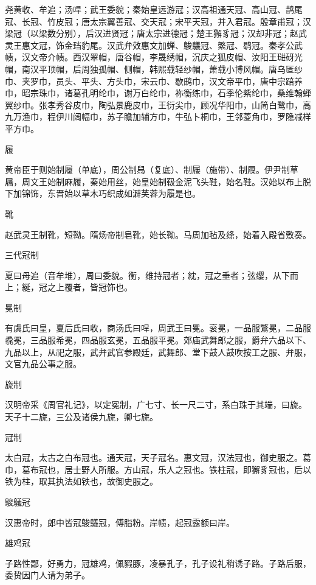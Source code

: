 \documentclass[a4paper,12pt,UTF8,twoside]{ctexbook}
\begin{document}
    尧黄收、牟追；汤哻；武王委貌；秦始皇远游冠；汉高祖通天冠、高山冠、鹊尾冠、长冠、竹皮冠；唐太宗翼善冠、交天冠；宋平天冠，并入君冠。殷章甫冠；汉梁冠（以梁数分别），后汉进贤冠；唐太宗进德冠；楚王獬豸冠；汉却非冠；赵武灵王惠文冠，饰金珰豹尾。汉武弁效惠文加蝉、鵔鸃冠、繁冠、鹖冠。秦孝公武帻，汉文帝介帻。西汉翠帽，唐谷帽，李晟绣帽，沉庆之狐皮帽、汝阳王琎砑光帽，南汉平顶帽，后周独孤帽、侧帽，韩熙载轻纱帽，萧载小博风帽。唐乌匼纱巾、夹罗巾，员头、平头、方头巾，宋云巾、歇鸱巾，汉文帝平巾，唐中宗踣养巾，昭宗珠巾，诸葛孔明纶巾，谢万白纶巾，祢衡练巾，石季伦紫纶巾，桑维翰蝉翼纱巾。张孝秀谷皮巾，陶弘景鹿皮巾，王衍尖巾，顾况华阳巾，山简白鹭巾，高九万渔巾，程伊川阔幅巾，苏子瞻加辅方巾，牛弘卜桐巾，王邻菱角巾，罗隐减样平方巾。
    
    履
    
    黄帝臣于则始制履（单底），周公制舄（复底）、制屦（施带）、制屧。伊尹制草屩，周文王始制麻履，秦始用丝，始皇始制靸金泥飞头鞋，始名鞋。汉始以布上脱下加锦饰，东晋始以草木巧织成如澼芙蓉为履是也。
    
    靴
    
    赵武灵王制靴，短靿。隋炀帝制皂靴，始长靿。马周加毡及绦，始着入殿省敷奏。
    
    三代冠制
    
    夏曰母追（音牟堆），周曰委貌。衡，维持冠者；紞，冠之垂者；弦缨，从下而上；綖，冠之上覆者，皆冠饰也。
    
    冕制
    
    有虞氏曰皇，夏后氏曰收，商汤氏曰哻，周武王曰冕。衮冕，一品服鷩冕，二品服毳冕，三品服希冕，四品服玄冕，五品服平冕。郊庙武舞郎之服，爵弁六品以下、九品以上，从祀之服，武弁武官参殿廷，武舞郎、堂下鼓人鼓吹按工之服、弁服，文官九品公事之服。
    
    旒制
    
    汉明帝采《周官礼记》，以定冕制，广七寸、长一尺二寸，系白珠于其端，曰旒。天子十二旒，三公及诸侯九旒，卿七旒。
    
    冠制
    
    太白冠，太古之白布冠也。通天冠，天子冠名。惠文冠，汉法冠也，御史服之。葛巾，葛布冠也，居士野人所服。方山冠，乐人之冠也。铁柱冠，即獬豸冠也，后以铁为柱，取其执法如铁也，故御史服之。
    
    鵔鸃冠
    
    汉惠帝时，郎中皆冠鵔鸃冠，傅脂粉。岸帻，起冠露额曰岸。
    
    雄鸡冠
    
    子路性鄙，好勇力，冠雄鸡，佩豭豚，凌暴孔子，孔子设礼稍诱子路。子路后服，委贽因门人请为弟子。
    
\end{document}

